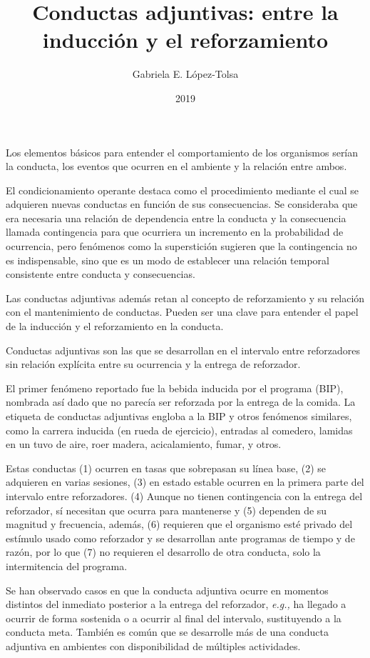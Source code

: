 \documentclass[a4paper,12pt]{article}
\title{Conductas adjuntivas: entre la inducción y el reforzamiento}
\author{Gabriela E. López-Tolsa}
\date{2019}
\begin{document}
{\scshape\bfseries \maketitle}

Los elementos básicos para entender el comportamiento de los organismos serían la conducta, los eventos que ocurren en el ambiente y la relación entre ambos.

El condicionamiento operante destaca como el procedimiento mediante el cual se adquieren nuevas conductas en función de sus consecuencias. Se consideraba que era necesaria una relación de dependencia entre la conducta y la consecuencia llamada contingencia para que ocurriera un incremento en la probabilidad de ocurrencia, pero fenómenos como la superstición sugieren que la contingencia no es indispensable, sino que es un modo de establecer una relación temporal consistente entre conducta y consecuencias.

Las conductas adjuntivas además retan al concepto de reforzamiento y su relación con el mantenimiento de conductas. Pueden ser una clave para entender el papel de la inducción y el reforzamiento en la conducta.

Conductas adjuntivas son las que se desarrollan en el intervalo entre reforzadores sin relación explícita entre su ocurrencia y la entrega de reforzador.

El primer fenómeno reportado fue la bebida inducida por el programa (BIP), nombrada así dado que no parecía ser reforzada por la entrega de la comida. La etiqueta de conductas adjuntivas engloba a la BIP y otros fenómenos similares, como la carrera inducida (en rueda de ejercicio), entradas al comedero, lamidas en un tuvo de aire, roer madera, acicalamiento, fumar, y otros.

Estas conductas (1) ocurren en tasas que sobrepasan su línea base, (2) se adquieren en varias sesiones, (3) en estado estable ocurren en la primera parte del intervalo entre reforzadores. (4) Aunque no tienen contingencia con la entrega del reforzador, sí necesitan que ocurra para mantenerse y (5) dependen de su magnitud y frecuencia, además, (6) requieren que el organismo esté privado del estímulo usado como reforzador y se desarrollan ante programas de tiempo y de razón, por lo que (7) no requieren el desarrollo de otra conducta, solo la intermitencia del programa.

Se han observado casos en que la conducta adjuntiva ocurre en momentos distintos del inmediato posterior a la entrega del reforzador, {\itshape e.g.,} ha llegado a ocurrir de forma sostenida o a ocurrir al final del intervalo, sustituyendo a la conducta meta. También es común que se desarrolle más de una conducta adjuntiva en ambientes con disponibilidad de múltiples actividades.
\end{document}
